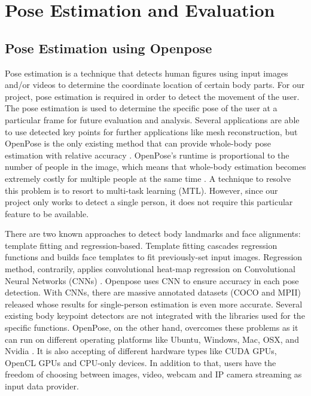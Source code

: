 \section{Pose Estimation and Evaluation}
\label{section:openposeLit}
\subsection{Pose Estimation using Openpose}
Pose estimation is a technique that detects human figures using input images and/or videos to determine the coordinate location of certain body parts. For our project, pose estimation is required in order to detect the movement of the user. The pose estimation is used to determine the specific pose of the user at a particular frame for future evaluation and analysis. Several applications are able to use detected key points for further applications like mesh reconstruction, but OpenPose is the only existing method that can provide whole-body pose estimation with relative accuracy \cite{wholebodyPoseEst}. OpenPose's runtime is proportional to the number of people in the image, which means that whole-body estimation becomes extremely costly  for multiple people at the same time \cite{wholebodyPoseEst}. A technique to resolve this problem is to resort to multi-task learning (MTL). However, since our project only works to detect a single person, it does not require this particular feature to be available. 


There are two known approaches to detect body landmarks and face alignments: template fitting and regression-based. Template fitting cascades regression functions and builds face templates to fit previously-set input images. Regression method, contrarily, applies convolutional heat-map regression on Convolutional Neural Networks (CNNs) \cite{wholebodyPoseEst}. Openpose uses CNN to ensure accuracy in each pose detection. With CNNs, there are massive annotated datasets (COCO and MPII) released whose results for single-person estimation is even more accurate. Several existing body keypoint detectors are not integrated with the libraries used for the specific functions. OpenPose, on the other hand, overcomes these problems as it can run on different operating platforms like Ubuntu, Windows, Mac, OSX, and Nvidia \cite{wholebodyPoseEst}. It is also accepting of different hardware types like CUDA GPUs, OpenCL GPUs and CPU-only devices. In addition to that, users have the freedom of choosing between images, video, webcam and IP camera streaming as input data provider. 


